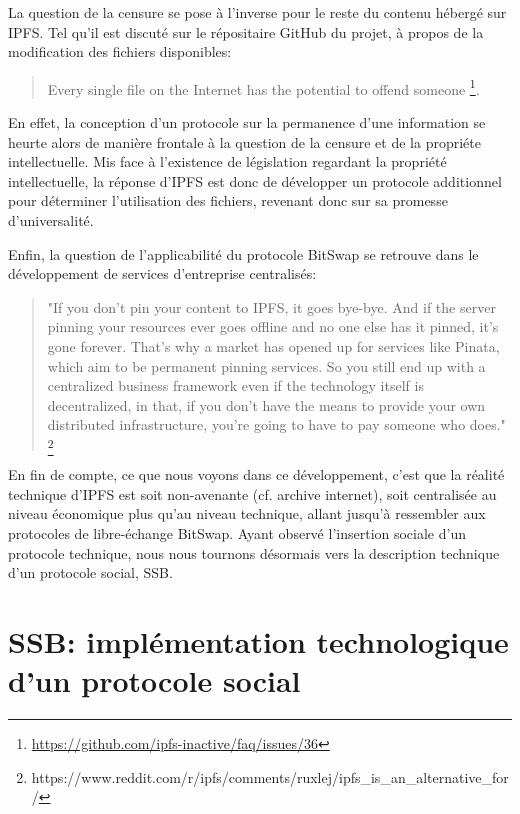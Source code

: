 \documentclass{article}
\begin{document}
La question de la censure se pose à l'inverse pour le reste du contenu hébergé sur IPFS. Tel qu'il est discuté sur le répositaire GitHub du projet, à propos de la modification des fichiers disponibles:

\begin{quote}
    Every single file on the Internet has the potential to offend someone \footnote{\url{https://github.com/ipfs-inactive/faq/issues/36}}.
\end{quote}

En effet, la conception d'un protocole sur la permanence d'une information se heurte alors de manière frontale à la question de la censure et de la propriéte intellectuelle. Mis face à l'existence de législation regardant la propriété intellectuelle, la réponse d'IPFS est donc de développer un protocole additionnel pour déterminer l'utilisation des fichiers, revenant donc sur sa promesse d'universalité.

Enfin, la question de l'applicabilité du protocole BitSwap se retrouve dans le développement de services d'entreprise centralisés:

\begin{quote}
    "If you don't pin your content to IPFS, it goes bye-bye. And if the server pinning your resources ever goes offline and no one else has it pinned, it's gone forever. That's why a market has opened up for services like Pinata, which aim to be permanent pinning services. So you still end up with a centralized business framework even if the technology itself is decentralized, in that, if you don't have the means to provide your own distributed infrastructure, you're going to have to pay someone who does." \footnote{https://www.reddit.com/r/ipfs/comments/ruxlej/ipfs_is_an_alternative_for/}
\end{quote}

En fin de compte, ce que nous voyons dans ce développement, c'est que la réalité technique d'IPFS est soit non-avenante (cf. archive internet), soit centralisée au niveau économique plus qu'au niveau technique, allant jusqu'à ressembler aux protocoles de libre-échange BitSwap. Ayant observé l'insertion sociale d'un protocole technique, nous nous tournons désormais vers la description technique d'un protocole social, SSB.

\section{SSB: implémentation technologique d'un protocole social}
\end{document}
